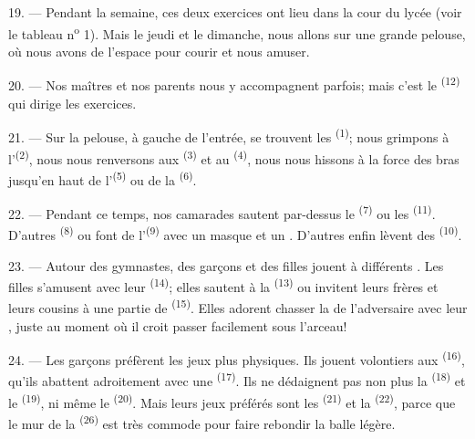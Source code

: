 19. --- Pendant la semaine, ces deux exercices ont lieu dans la cour du lycée
(voir le tableau n\textsuperscript{o} 1). Mais le jeudi et le dimanche, nous
allons sur une grande pelouse, où nous avons de l'espace pour courir et nous
amuser.

20. --- Nos maîtres et nos parents nous y accompagnent parfois; mais c'est le
\textsuperscript{(12)} qui dirige les
exercices.

21. --- Sur la pelouse, à gauche de l'entrée, se trouvent les \textsuperscript{(1)}; nous grimpons à
l'\textsuperscript{(2)}, nous nous renversons aux
\textsuperscript{(3)} et au
\textsuperscript{(4)}, nous nous hissons à la force des bras
jusqu'en haut de l'\textsuperscript{(5)} ou de la
\textsuperscript{(6)}.

22. --- Pendant ce temps, nos camarades sautent par-dessus le \textsuperscript{(7)} ou les \textsuperscript{(11)}. D'autres \textsuperscript{(8)}
ou font de l'\textsuperscript{(9)} avec un masque et un
. D'autres enfin lèvent des
\textsuperscript{(10)}.

\VUsaut{4.6mm}
\VUsaut{3.0mm}

23. --- Autour des gymnastes, des garçons et des filles jouent à différents
. Les filles s'amusent avec leur
\textsuperscript{(14)}; elles sautent à la \textsuperscript{(13)} ou invitent leurs frères et leurs cousins à une
partie de \textsuperscript{(15)}. Elles adorent chasser la
 de l'adversaire avec leur , juste au
moment où il croit passer facilement sous l'arceau!

24. --- Les garçons préfèrent les jeux plus physiques. Ils jouent volontiers
aux \textsuperscript{(16)}, qu'ils abattent adroitement avec
une \textsuperscript{(17)}. Ils ne dédaignent pas non plus la
\textsuperscript{(18)} et le
\textsuperscript{(19)}, ni même le \textsuperscript{(20)}. Mais leurs jeux préférés sont les
\textsuperscript{(21)} et la \textsuperscript{(22)}, parce que le mur de la
\textsuperscript{(26)} est très commode pour faire rebondir la
balle légère.

